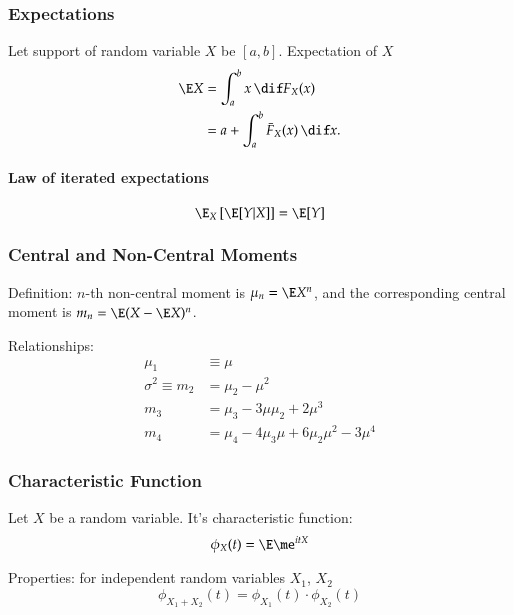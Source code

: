 \documentclass[a4paper]{article}
\numberwithin{equation}{subsection}
\begin{document}
\subsubsection{Expectations}
Let support of random variable $X$ be $[a, b]$.  Expectation of $X$
\begin{align}
  \E X
  &=
  \int_a^b x \, \dif F_X(x)\\
  &=
  a + \int_a^b \bar F_X(x) \,\dif x.
\end{align}

\paragraph{Law of iterated expectations}
\begin{equation}
  \E_X
  \left[ \E [Y|X] \right]
  =
  \E [Y]
\end{equation}


\subsubsection{Central and Non-Central Moments}

Definition: $n$-th non-central moment is $\mu_{n} = \E X^{n}$, and the
corresponding central moment is $m_{n} = \E ( X - \E X)^{n}$.

Relationships:
\begin{align}
  \mu_{1} &\equiv \mu
  \\
  \sigma^{2} \equiv m_{2} &= \mu_{2} - \mu^{2}
  \\
  m_{3} &= \mu_{3}- 3 \mu \mu_{2} + 2\mu^{3}
  \\
  m_{4} &= \mu_{4} - 4 \mu_{3} \mu + 6 \mu_{2} \mu^{2} -3 \mu^{4}
\end{align}


\subsubsection{Characteristic  Function}
\label{sec:characteristic_function}

Let $X$ be a random variable.  It's characteristic function:
\begin{equation}
  \label{eq:characteristic_function}
  \phi_{X}(t) = \E \me^{itX}
\end{equation}

Properties: for independent random variables $X_{1}$, $X_{2}$
\begin{equation}
  \phi_{X_{1} + X_{2}}(t) = \phi_{X_{1}}(t) \cdot \phi_{X_{2}}(t)
\end{equation}
\end{document}
